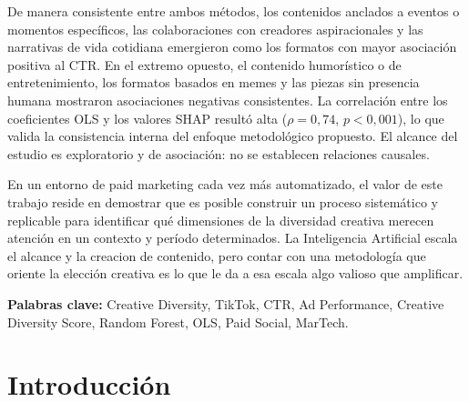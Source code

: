 \documentclass[12pt, a4paper]{report}
\begin{document}
De manera consistente entre ambos métodos, los contenidos anclados a eventos
o momentos específicos, las colaboraciones con creadores aspiracionales y las
narrativas de vida cotidiana emergieron como los formatos con mayor asociación
positiva al CTR. En el extremo opuesto, el contenido humorístico o
de entretenimiento, los formatos basados en memes y las piezas sin presencia
humana mostraron asociaciones negativas consistentes. La correlación entre los
coeficientes OLS y los valores SHAP resultó alta
($\rho = 0{,}74$, $p < 0{,}001$), lo que valida la consistencia interna del
enfoque metodológico propuesto. El alcance del estudio es exploratorio y de
asociación: no se establecen relaciones causales.

En un entorno de paid marketing cada vez más automatizado, el valor de este
trabajo reside en demostrar que es posible construir un proceso sistemático
y replicable para identificar qué dimensiones de la diversidad creativa
merecen atención en un contexto y período determinados. La Inteligencia
Artificial escala el alcance y la creacion de contenido, pero contar con una metodología que oriente
la elección creativa es lo que le da a esa escala algo valioso que amplificar.

\bigskip
\textbf{Palabras clave:} Creative Diversity, TikTok, CTR, Ad Performance,
Creative Diversity Score, Random Forest, OLS, Paid Social, MarTech.\newpage

\tableofcontents
\newpage

\listoffigures
{}
\newpage

\listoftables
{}
\newpage

\pagestyle{fancy}
\setcounter{page}{1}

\chapter{Introducción}
\end{document}
